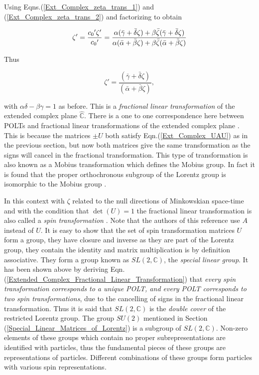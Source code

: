 \noindent Using Eqns.(\ref{Ext_Complex_zeta_trans_1}) and (\ref{Ext_Complex_zeta_trans_2}) and factorizing to obtain

\begin{equation*}
\zeta' = \frac{{c_0}'\zeta'}{{c_0}'} = \frac{\alpha(\bar{\gamma} + \bar{\delta}\zeta) + \beta \bar{\zeta}(\bar{\gamma} + \bar{\delta}\zeta)}{\alpha(\bar{\alpha} + \bar{\beta}\zeta) + \beta \bar{\zeta}(\bar{\alpha} + \bar{\beta}\zeta)} \\
\end{equation*}

\noindent Thus 

\begin{equation}\label{Extended_Complex_Fractional_Linear_Transformation}
\zeta' = \frac{(\bar{\gamma} + \bar{\delta}\zeta)}{(\bar{\alpha} + \bar{\beta}\zeta)},
\end{equation}

\noindent with $\alpha\delta - \beta\gamma = 1$ as before. This is a \textit{fractional linear transformation} of the extended complex plane $\hat{\mathbb{C}}$. There is a one to one correspondence here between POLTs and fractional linear transformations of the extended complex plane \cite[p. 9-10]{Hypersurfaces_Hogan_Barrabes}. This is because the matrices $\pm U$ both satisfy Eqn.(\ref{Ext_Complex_UAU}) as in the previous section, but now both matrices give the same transformation as the signs will cancel in the fractional transformation. This type of transformation is also known as a Mobius transformation which defines the Mobius group. In fact it is found that the proper orthochronous subgroup of the Lorentz group is isomorphic to the Mobius group \cite[p. 122]{Needham_Mobius}. 

In this context with $\zeta$ related to the null directions of Minkowskian space-time and with the condition that $\det({U}) =1$ the fractional linear transformation is also called a \textit{spin transformation} \cite[p. 15]{Spinors_I_Penrose}. Note that the authors of this reference use $A$ instead of $U$. It is easy to show that the set of spin transformation matrices $U$ form a group, they have closure and inverse as they are part of the Lorentz group, they contain the identity and matrix multiplication is by definition associative. They form a group known as $SL(2,\mathbb{C})$, the \textit{special linear group}. It has been shown above by deriving Eqn.(\ref{Extended_Complex_Fractional_Linear_Transformation}) that \textit{every spin transformation corresponds to a unique POLT, and every POLT corresponds to two spin transformations}, due to the cancelling of signs in the fractional linear transformation. Thus it is said that $SL(2,\mathbb{C})$ is the \textit{double cover} of the restricted Lorentz group. The group $SU(2)$ mentioned in Section (\ref{Special_Linear_Matrices_of_Lorentz}) is a subgroup of $SL(2,\mathbb{C})$. Non-zero elements of these groups which contain no proper subrepresentations are identified with particles, thus the fundamental pieces of these groups are representations of particles. Different combinations of these groups form particles with various spin representations.        

